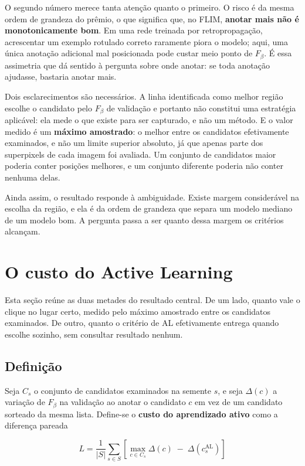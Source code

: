 O segundo número merece tanta atenção quanto o primeiro. O risco é da mesma ordem de grandeza do prêmio, o que significa que, no \ac{FLIM}, \textbf{anotar mais não é monotonicamente bom}. Em uma rede treinada por retropropagação, acrescentar um exemplo rotulado correto raramente piora o modelo; aqui, uma única anotação adicional mal posicionada pode custar meio ponto de $F_\beta$. É essa assimetria que dá sentido à pergunta sobre onde anotar: se toda anotação ajudasse, bastaria anotar mais.

Dois esclarecimentos são necessários. A linha identificada como melhor região escolhe o candidato pelo $F_\beta$ de validação e portanto não constitui uma estratégia aplicável: ela mede o que existe para ser capturado, e não um método. E o valor medido é um \textbf{máximo amostrado}: o melhor entre os candidatos efetivamente examinados, e não um limite superior absoluto, já que apenas parte dos superpixels de cada imagem foi avaliada. Um conjunto de candidatos maior poderia conter posições melhores, e um conjunto diferente poderia não conter nenhuma delas.

Ainda assim, o resultado responde à ambiguidade. Existe margem considerável na escolha da região, e ela é da ordem de grandeza que separa um modelo mediano de um modelo bom. A pergunta passa a ser quanto dessa margem os critérios alcançam.

\section{O custo do Active Learning}
\label{sec_custo_al}

Esta seção reúne as duas metades do resultado central. De um lado, quanto vale o clique no lugar certo, medido pelo máximo amostrado entre os candidatos examinados. De outro, quanto o critério de \ac{AL} efetivamente entrega quando escolhe sozinho, sem consultar resultado nenhum.

\subsection{Definição}

Seja $C_s$ o conjunto de candidatos examinados na semente $s$, e seja $\Delta(c)$ a variação de $F_\beta$ na validação ao anotar o candidato $c$ em vez de um candidato sorteado da mesma lista. Define-se o \textbf{custo do aprendizado ativo} como a diferença pareada

\begin{equation}
L = \frac{1}{|S|}\sum_{s \in S} \left[ \max_{c \in C_s} \Delta(c) \;-\; \Delta\!\left(c^{\text{AL}}_s\right) \right]
\label{eq_custo_al}
\end{equation}


